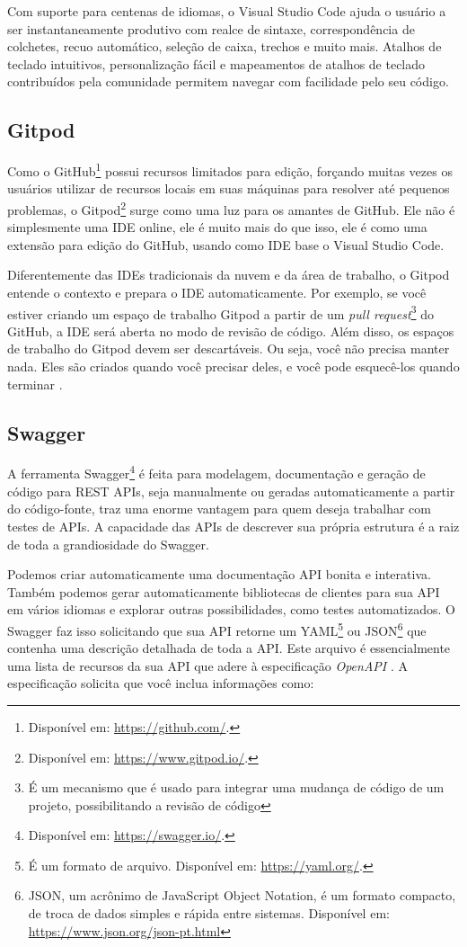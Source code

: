 Com suporte para centenas de idiomas, o Visual Studio Code ajuda o usuário a ser instantaneamente produtivo com realce de sintaxe, correspondência de colchetes, recuo automático, seleção de caixa, trechos e muito mais. Atalhos de teclado intuitivos, personalização fácil e mapeamentos de atalhos de teclado contribuídos pela comunidade permitem navegar com facilidade pelo seu código. \cite{mjbvz2020VSCode}


\subsection{Gitpod}
\label{ssec:Gitpod}
Como o GitHub\footnote{Disponível em: \url{https://github.com/}.} possui recursos limitados para edição, forçando muitas vezes os usuários utilizar de recursos locais em suas máquinas para resolver até pequenos problemas, o Gitpod\footnote{Disponível em: \url{https://www.gitpod.io/}.} surge como uma luz para os amantes de GitHub. Ele não é simplesmente uma IDE online, ele é muito mais do que isso, ele é como uma extensão para edição do GitHub, usando como IDE base o Visual Studio Code. 

Diferentemente das IDEs tradicionais da nuvem e da área de trabalho, o Gitpod entende o contexto e prepara o IDE automaticamente. Por exemplo, se você estiver criando um espaço de trabalho Gitpod a partir de um \textit{pull request}\footnote{É um mecanismo que é usado para integrar uma mudança de código de um projeto, possibilitando a revisão de código} do GitHub, a IDE será aberta no modo de revisão de código. Além disso, os espaços de trabalho do Gitpod devem ser descartáveis. Ou seja, você não precisa manter nada. Eles são criados quando você precisar deles, e você pode esquecê-los quando terminar \cite{jankeromnes2020Gitpod}. 


\subsection{Swagger}
\label{ssec:Swagger}
A ferramenta Swagger\footnote{Disponível em: \url{https://swagger.io/}.} é feita para modelagem, documentação e geração de código para REST APIs, seja manualmente ou geradas automaticamente a partir do código-fonte, traz uma enorme vantagem para quem deseja trabalhar com testes de APIs. A capacidade das APIs de descrever sua própria estrutura é a raiz de toda a grandiosidade do Swagger.

Podemos criar automaticamente uma documentação API bonita e interativa. Também podemos gerar automaticamente bibliotecas de clientes para sua API em vários idiomas e explorar outras possibilidades, como testes automatizados. O Swagger faz isso solicitando que sua API retorne um YAML\footnote{É um formato de arquivo. Disponível em: \url{https://yaml.org/}.} ou JSON\footnote{JSON, um acrônimo de JavaScript Object Notation, é um formato compacto, de troca de dados simples e rápida entre sistemas. Disponível em: \url{https://www.json.org/json-pt.html}} que contenha uma descrição detalhada de toda a API. Este arquivo é essencialmente uma lista de recursos da sua API que adere à especificação \textit{OpenAPI} \cite{shockey2020Swagger}. A especificação solicita que você inclua informações como:

